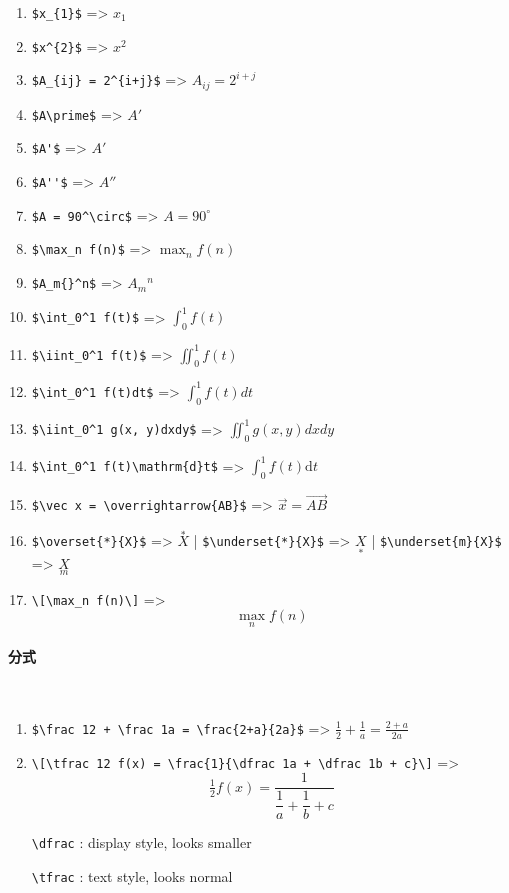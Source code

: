 \begin{enumerate}[topsep=0pt,itemsep=0pt,parsep=0pt,leftmargin=3.6em,label=\arabic*>]
    \item {\color{teal}\verb!$x_{1}$!} => $x_{1}$
    \item {\color{teal}\verb!$x^{2}$!} => $x^{2}$
    \item {\color{teal}\verb!$A_{ij} = 2^{i+j}$!} => $A_{ij} = 2^{i+j}$
    \item {\color{teal}\verb!$A\prime$!} => $A\prime$
    \item {\color{teal}\verb!$A'$!} => $A'$
    \item {\color{teal}\verb!$A''$!} => $A''$
    \item {\color{teal}\verb!$A = 90^\circ$!} => $A = 90^\circ$
    \item {\color{teal}\verb!$\max_n f(n)$!} => $\max_n f(n)$
    \item {\color{teal}\verb!$A_m{}^n$!} => $A_m{}^n$
    \item {\color{teal}\verb!$\int_0^1 f(t)$!} => $\int_0^1 f(t)$
    \item {\color{teal}\verb!$\iint_0^1 f(t)$!} => $\iint_0^1 f(t)$
    \item {\color{teal}\verb!$\int_0^1 f(t)dt$!} => $\int_0^1 f(t)dt$
    \item {\color{teal}\verb!$\iint_0^1 g(x, y)dxdy$!} => $\iint_0^1 g(x, y)dxdy$
    \item {\color{teal}\verb!$\int_0^1 f(t)\mathrm{d}t$!} => $\int_0^1 f(t)\mathrm{d}t$
    \item {\color{teal}\verb!$\vec x = \overrightarrow{AB}$!} => $\vec x = \overrightarrow{AB}$

    \item {\color{teal}\verb!$\overset{*}{X}$!} => $\overset{*}{X}$ {\color{red}|} 
          {\color{teal}\verb!$\underset{*}{X}$!} => $\underset{*}{X}$ {\color{red}|} 
          {\color{teal}\verb!$\underset{m}{X}$!} => $\underset{m}{X}$
    \item {\color{teal}\verb!\[\max_n f(n)\]!} => \[\max_n f(n)\]
\end{enumerate}

\paragraph{分式}~{}

\begin{enumerate}[topsep=0pt,itemsep=0pt,parsep=0pt,leftmargin=3.6em,label=\arabic*>]
    \item {\color{teal}\verb!$\frac 12 + \frac 1a = \frac{2+a}{2a}$!} => $\frac 12 + \frac 1a = \frac{2+a}{2a}$
    \item {\color{teal}\verb!\[\tfrac 12 f(x) = \frac{1}{\dfrac 1a + \dfrac 1b + c}\]!} 
        => \[\tfrac 12 f(x) = \frac{1}{\dfrac 1a + \dfrac 1b + c}\] \par
        {\color{teal}\verb!\dfrac!} : display style, looks smaller \par
        {\color{teal}\verb!\tfrac!} : text style, looks normal
\end{enumerate}

